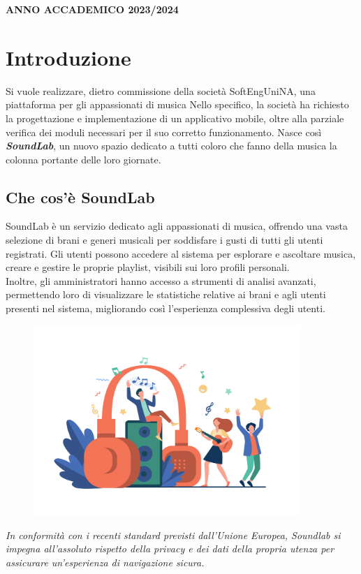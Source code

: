\documentclass{article}
\begin{document}
	\vspace{0.5cm}
	
	\begin{center}
		\textbf{ANNO ACCADEMICO 2023/2024}
	\end{center}
	

	\renewcommand{\contentsname}{Indice} %
	\tableofcontents %
	
	\clearpage
	
	\section{Introduzione}
	Si vuole realizzare, dietro commissione della società SoftEngUniNA, una piattaforma per gli appassionati di musica
	Nello specifico, la società ha richiesto la progettazione e implementazione di un applicativo mobile, oltre alla parziale verifica dei moduli necessari per il suo corretto funzionamento.
	Nasce così \textbf{\textit{\textcolor{dark_purple}{SoundLab}}}, un nuovo spazio dedicato a tutti coloro che fanno della musica la colonna portante delle loro giornate.
		\subsection{Che cos'è SoundLab}
		SoundLab è un servizio dedicato agli appassionati di musica, offrendo una vasta selezione di brani e generi musicali per soddisfare i gusti di tutti gli utenti registrati. Gli utenti possono accedere al sistema per esplorare e ascoltare musica, creare e gestire le proprie playlist, visibili sui loro profili personali. \\Inoltre, gli amministratori hanno accesso a strumenti di analisi avanzati, permettendo loro di visualizzare le statistiche relative ai brani e agli utenti presenti nel sistema, migliorando così l'esperienza complessiva degli utenti.
		\\
		\begin{figure}[H]
			\centering
			\includegraphics[width=0.9\textwidth]{Immagini/5870}
		\end{figure}
		\textit{In conformità con i recenti standard previsti dall’Unione Europea, Soundlab si impegna all’assoluto rispetto della privacy e dei dati della propria utenza per assicurare un’esperienza di navigazione sicura.}
\end{document}
